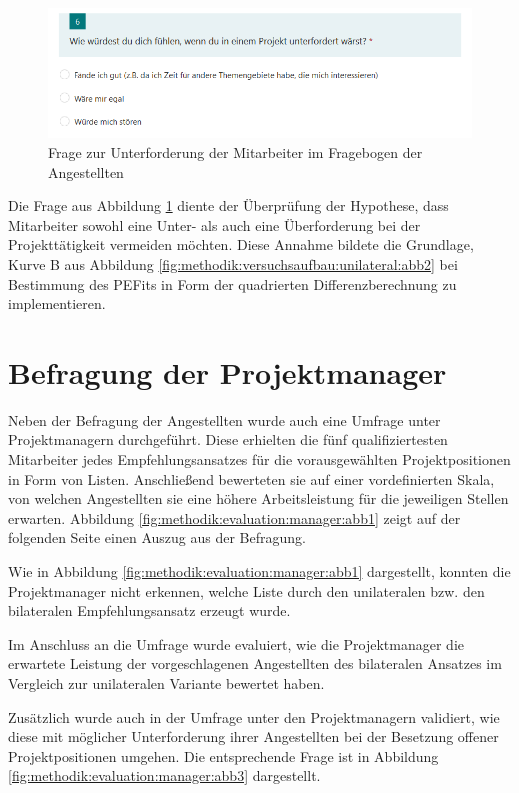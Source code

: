 \begin{figure}[h]
	\centering
	\includegraphics[width=1\textwidth]{gfx/umfrage-mitarbeiter-unterforderung.png}
	\caption{Frage zur Unterforderung der Mitarbeiter im Fragebogen der Angestellten}
	\label{fig:methodik:evaluation:abb3}
\end{figure}

Die Frage aus Abbildung \ref{fig:methodik:evaluation:abb3} diente der Überprüfung der Hypothese, dass Mitarbeiter sowohl eine Unter- als auch eine Überforderung bei der Projekttätigkeit vermeiden möchten. Diese Annahme bildete die Grundlage, Kurve B aus Abbildung \ref{fig:methodik:versuchsaufbau:unilateral:abb2} bei Bestimmung des \acp{PEFit} in Form der quadrierten Differenzberechnung zu implementieren.

\section{Befragung der Projektmanager}
\label{ch:methodik:evaluation:manager}
Neben der Befragung der Angestellten wurde auch eine Umfrage unter Projektmanagern durchgeführt. Diese erhielten die fünf qualifiziertesten Mitarbeiter jedes Empfehlungsansatzes für die vorausgewählten Projektpositionen in Form von Listen. Anschließend bewerteten sie auf einer vordefinierten Skala, von welchen Angestellten sie eine höhere Arbeitsleistung für die jeweiligen Stellen erwarten. Abbildung \ref{fig:methodik:evaluation:manager:abb1} zeigt auf der folgenden Seite einen Auszug aus der Befragung.

Wie in Abbildung \ref{fig:methodik:evaluation:manager:abb1} dargestellt, konnten die Projektmanager nicht erkennen, welche Liste durch den unilateralen bzw. den bilateralen Empfehlungsansatz erzeugt wurde.

Im Anschluss an die Umfrage wurde evaluiert, wie die Projektmanager die erwartete Leistung der vorgeschlagenen Angestellten des bilateralen Ansatzes im Vergleich zur unilateralen Variante bewertet haben.

Zusätzlich wurde auch in der Umfrage unter den Projektmanagern validiert, wie diese mit möglicher Unterforderung ihrer Angestellten bei der Besetzung offener Projektpositionen umgehen. Die entsprechende Frage ist in Abbildung \ref{fig:methodik:evaluation:manager:abb3} dargestellt.

